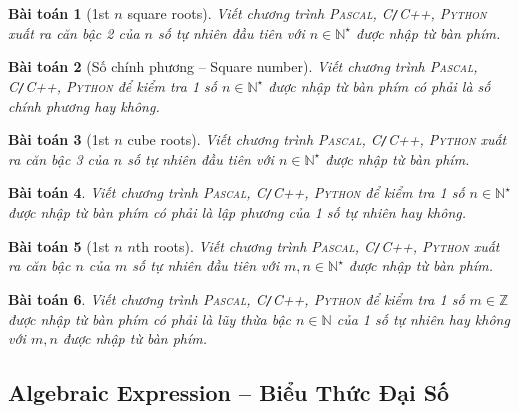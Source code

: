 \documentclass{article}
\newtheorem{baitoan}{Bài toán}
\begin{document}
\begin{baitoan}[1st $n$ square roots]
	Viết chương trình \textsc{Pascal, C\texttt{/}C++, Python} xuất ra căn bậc 2 của $n$ số tự nhiên đầu tiên với $n\in\mathbb{N}^\star$ được nhập từ bàn phím.
\end{baitoan}

\begin{baitoan}[Số chính phương -- Square number]
	Viết chương trình \textsc{Pascal, C\texttt{/}C++, Python} để kiểm tra 1 số $n\in\mathbb{N}^\star$ được nhập từ bàn phím có phải là số chính phương hay không.
\end{baitoan}

\begin{baitoan}[1st $n$ cube roots]
	Viết chương trình \textsc{Pascal, C\texttt{/}C++, Python} xuất ra căn bậc 3 của $n$ số tự nhiên đầu tiên với $n\in\mathbb{N}^\star$ được nhập từ bàn phím.
\end{baitoan}

\begin{baitoan}
	Viết chương trình \textsc{Pascal, C\texttt{/}C++, Python} để kiểm tra 1 số $n\in\mathbb{N}^\star$ được nhập từ bàn phím có phải là lập phương của 1 số tự nhiên hay không.
\end{baitoan}

\begin{baitoan}[1st $n$ $n$th roots]
	Viết chương trình \textsc{Pascal, C\texttt{/}C++, Python} xuất ra căn bậc $n$ của $m$ số tự nhiên đầu tiên với $m,n\in\mathbb{N}^\star$ được nhập từ bàn phím.
\end{baitoan}

\begin{baitoan}
	Viết chương trình \textsc{Pascal, C\texttt{/}C++, Python} để kiểm tra 1 số $m\in\mathbb{Z}$ được nhập từ bàn phím có phải là lũy thừa bậc $n\in\mathbb{N}$ của 1 số tự nhiên hay không với $m,n$ được nhập từ bàn phím.
\end{baitoan}


\subsection{Algebraic Expression -- Biểu Thức Đại Số}
\end{document}
